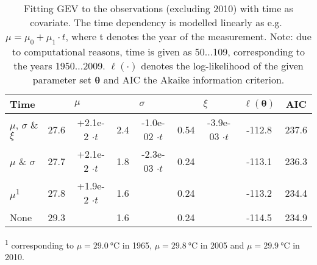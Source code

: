 \begin{table}[h!tb]
\caption{Fitting GEV to the observations (excluding 2010) with time as covariate. 
The time dependency is modelled linearly as e.g.\ $\mu = \mu_0 + \mu_1\cdot t$, where t denotes the year of the measurement.
Note: due to computational reasons, time is given as 50...109, corresponding to the years 1950...2009.
$\ell(\boldsymbol{\cdot})$ denotes the log-likelihood of the given parameter set $\boldsymbol{\theta}$ and AIC the Akaike information criterion.}
{
\centering
\begin{tabular}{l
S[table-format=2.1]@{\,}
S[table-format=+1.1e-1,table-space-text-post=$\cdot t$]
S[table-format=2.1]@{ }
S[table-format=+1.1e-1,table-space-text-post=$\cdot t$]
S[table-format=2.2]@{ }
S[table-format=+1.1e-1,table-space-text-post=$\cdot t$]
S[table-format=-3.1]
S[table-format=3.1]
}
\toprule
Time         &  &  &  & {$\ell(\boldsymbol{\theta})$} & AIC \\
\midrule
$\mu$, $\sigma$ \& $\xi$ & 27.6 & +2.1e-2 $\cdot t$ & 2.4 & -1.0e-02  $\cdot t$  & 0.54 & -3.9e-03 $\cdot t$ & -112.8 & 237.6 \\
$\mu$ \& $\sigma$        & 27.7 & +2.1e-2 $\cdot t$ & 1.8 & -2.3e-03  $\cdot t$  & 0.24 &                    & -113.1 & 236.3 \\
$\mu$\textsuperscript{1} & 27.8 & +1.9e-2 $\cdot t$ & 1.6 &                      & 0.24 &                    & -113.2 & 234.4 \\
None                 & 29.3 &                   & 1.6  &                     & 0.24 &                    & -114.5 & 234.9 \\
\bottomrule
\end{tabular}

} %
\footnotesize{\vspace*{1ex} \textsuperscript{1} corresponding to $\mu=\SI{29.0}{\celsius}$ in 1965, $\mu=\SI{29.8}{\celsius}$ in 2005 and $\mu=\SI{29.9}{\celsius}$ in 2010.}
\end{table}


